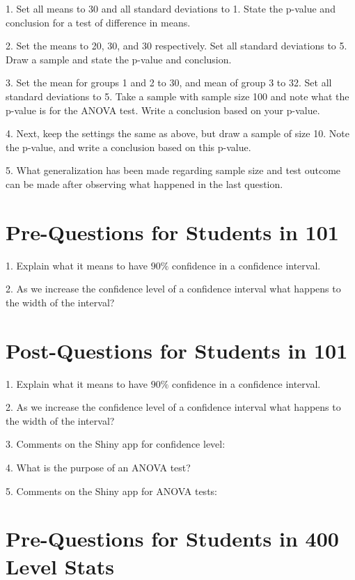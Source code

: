 \documentclass[11pt]{amsart}
\begin{document}
1. Set all means to 30 and all standard deviations to 1.  State the p-value and conclusion for a test of difference in means.

2.  Set the means to 20, 30, and 30 respectively.  Set all standard deviations to 5.  Draw a sample and state the p-value and conclusion.  

3. Set the mean for groups 1 and 2 to 30, and mean of group 3 to 32.  Set all standard deviations to 5.  Take a sample with sample size 100 and note what the p-value is for the ANOVA test.  Write a conclusion based on your p-value.

4. Next, keep the settings the same as above, but draw a sample of size 10.  Note the p-value, and write a conclusion based on this p-value.  

5.  What generalization has been made regarding sample size and test outcome can be made after observing what happened in the last question.

\newpage



\section{Pre-Questions for Students in 101}

1. Explain what it means to have $90\%$ confidence in a confidence interval.


2. As we increase the confidence level of a confidence interval what happens to the width of the interval?



\section{Post-Questions for Students in 101}

1. Explain what it means to have $90\%$ confidence in a confidence interval.


2. As we increase the confidence level of a confidence interval what happens to the width of the interval?


3. Comments on the Shiny app for confidence level:


4. What is the purpose of an ANOVA test?


5. Comments on the Shiny app for ANOVA tests:




\section{Pre-Questions for Students in 400 Level Stats}
\end{document}
